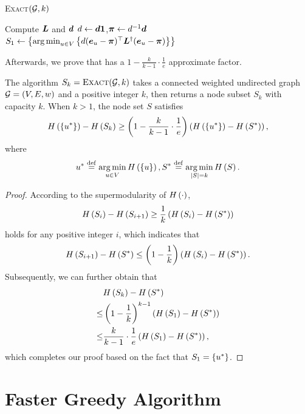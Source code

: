 \documentclass[sigconf]{acmart}
\begin{document}
\begin{algorithm}
    \caption{\textsc{Exact}\((\mathcal{G},k)\)}
    \label{algo:exact}
    Compute \(\boldsymbol{L}\) and \(\boldsymbol{d}\)\;
    \(d\gets\boldsymbol{d}\boldsymbol{1}\),\(\boldsymbol{\pi}\gets d^{-1}\boldsymbol{d}\)\;
    \(S_1\gets\left\{\operatorname*{arg\,min}_{u\in V}\left\{d(\boldsymbol{e}_u-\boldsymbol{\pi})^\top\boldsymbol{L}^\dagger(\boldsymbol{e}_u-\boldsymbol{\pi}) \right\} \right\}\)\;
\end{algorithm}

Afterwards, we prove that  has a \(1-\frac{k}{k-1}\cdot\frac{1}{e}\) approximate factor.
\begin{theorem}
    The algorithm \(S_k=\textsc{Exact}(\mathcal{G},k)\) takes a connected weighted undirected graph \(\mathcal{G}=(V,E,w)\) and a positive integer \(k\), then returns a node subset \(S_k\) with capacity \(k\).
    When \(k>1\), the node set \(S\) satisfies
    \[H\left(\left\{u^* \right\}\right)-H\left(S_k\right)\ge\left( 1-\frac{k}{k-1}\cdot\frac{1}{e} \right)\left( H\left(\left\{u^* \right\}\right)-H\left(S^*\right) \right),\]
    where
    \[u^*\stackrel{\mathrm{def}}{=}\operatorname*{arg\,min}_{u\in V}H\left(\left\{u \right\}\right),S^*\stackrel{\mathrm{def}}{=}\operatorname*{arg\,min}_{\left|S \right|=k}H\left(S\right).\]
\end{theorem}
\begin{proof}
    According to the supermodularity of \(H\left(\cdot\right)\),
    \[H\left(S_i\right)-H\left(S_{i+1}\right)\ge\frac{1}{k}\left( H\left(S_i\right)-H\left(S^*\right) \right)\]
    holds for any positive integer \(i\), which indicates that
    \[H\left(S_{i+1}\right)-H\left(S^*\right)\le\left( 1-\frac{1}{k} \right)\left( H\left(S_i\right)-H\left(S^*\right) \right).\]
    Subsequently, we can further obtain that
    \begin{align*}
            & H\left(S_k\right)-H\left(S^*\right)                                       \\
        \le & \left( 1-\frac{1}{k} \right)^{k-1}\left( H\left(S_1\right)-H\left(S^*\right) \right)    \\
        \le & \frac{k}{k-1}\cdot\frac{1}{e}\left( H\left(S_1\right)-H\left(S^*\right) \right),
    \end{align*}
    which completes our proof based on the fact that \(S_1=\left\{u^* \right\}\).
\end{proof}

\section{Faster Greedy Algorithm}\label{sec:faster-greedy}
\end{document}
